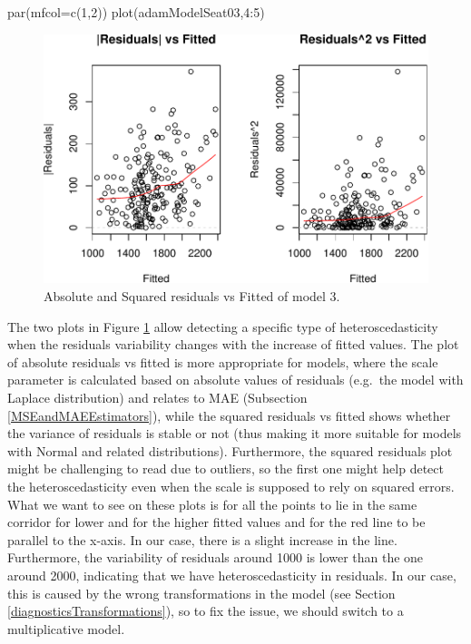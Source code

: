 \documentclass[
]{book}
\newenvironment{Shaded}{\begin{snugshade}}{\end{snugshade}}
\newcommand{\AttributeTok}[1]{\textcolor[rgb]{0.77,0.63,0.00}{#1}}
\newcommand{\DecValTok}[1]{\textcolor[rgb]{0.00,0.00,0.81}{#1}}
\newcommand{\FunctionTok}[1]{\textcolor[rgb]{0.00,0.00,0.00}{#1}}
\newcommand{\NormalTok}[1]{#1}
\newcommand{\SpecialCharTok}[1]{\textcolor[rgb]{0.00,0.00,0.00}{#1}}
\theoremstyle{definition}
\theoremstyle{definition}
\theoremstyle{definition}
\theoremstyle{definition}
\theoremstyle{remark}
\begin{document}
\begin{Shaded}
\begin{Highlighting}[]
\FunctionTok{par}\NormalTok{(}\AttributeTok{mfcol=}\FunctionTok{c}\NormalTok{(}\DecValTok{1}\NormalTok{,}\DecValTok{2}\NormalTok{))}
\FunctionTok{plot}\NormalTok{(adamModelSeat03,}\DecValTok{4}\SpecialCharTok{:}\DecValTok{5}\NormalTok{)}
\end{Highlighting}
\end{Shaded}

\begin{figure}
\centering
\includegraphics{Svetunkov--2022----ADAM_files/figure-latex/adamModelSeat03Hetero-1.pdf}
\caption{\label{fig:adamModelSeat03Hetero}Absolute and Squared residuals vs Fitted of model 3.}
\end{figure}

The two plots in Figure \ref{fig:adamModelSeat03Hetero} allow detecting a specific type of heteroscedasticity when the residuals variability changes with the increase of fitted values. The plot of absolute residuals vs fitted is more appropriate for models, where the scale parameter is calculated based on absolute values of residuals (e.g.~the model with Laplace distribution) and relates to MAE (Subsection \ref{MSEandMAEEstimators}), while the squared residuals vs fitted shows whether the variance of residuals is stable or not (thus making it more suitable for models with Normal and related distributions). Furthermore, the squared residuals plot might be challenging to read due to outliers, so the first one might help detect the heteroscedasticity even when the scale is supposed to rely on squared errors. What we want to see on these plots is for all the points to lie in the same corridor for lower and for the higher fitted values and for the red line to be parallel to the x-axis. In our case, there is a slight increase in the line. Furthermore, the variability of residuals around 1000 is lower than the one around 2000, indicating that we have heteroscedasticity in residuals. In our case, this is caused by the wrong transformations in the model (see Section \ref{diagnosticsTransformations}), so to fix the issue, we should switch to a multiplicative model.
\end{document}
